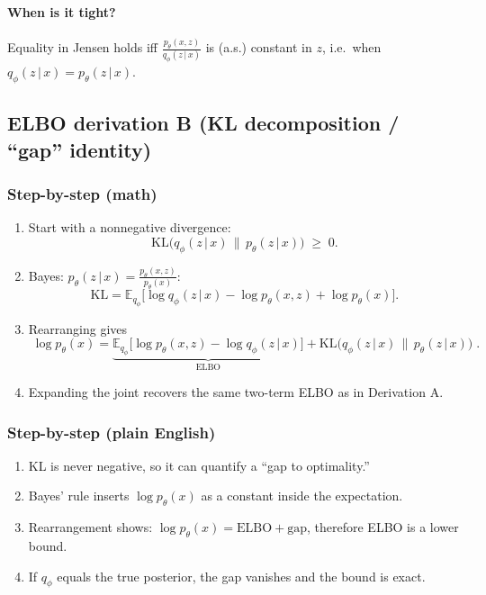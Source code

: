\documentclass[11pt]{article}
\newcommand{\E}{\mathbb{E}}
\newcommand{\KL}{\mathrm{KL}}
\newcommand{\given}{\,\vert\,}
\theoremstyle{remark}
\begin{document}
\paragraph{When is it tight?}
Equality in Jensen holds iff $\frac{p_\theta(x,z)}{q_\phi(z\given x)}$ is (a.s.) constant in $z$, i.e.\ when $q_\phi(z\given x)=p_\theta(z\given x)$.

\subsection{ELBO derivation B (KL decomposition / ``gap'' identity)}
\subsubsection*{Step-by-step (math)}
\begin{enumerate}[leftmargin=1.6em]
  \item Start with a nonnegative divergence:
  \[
  \KL\!\big(q_\phi(z\given x)\,\|\,p_\theta(z\given x)\big)\;\ge\;0.
  \]
  \item Bayes: $p_\theta(z\given x)=\frac{p_\theta(x,z)}{p_\theta(x)}$:
  \[
  \KL
  = \E_{q_\phi}\!\big[\log q_\phi(z\given x)-\log p_\theta(x,z)+\log p_\theta(x)\big].
  \]
  \item Rearranging gives
  \[
  \boxed{\;
  \log p_\theta(x)
  = \underbrace{\E_{q_\phi}\!\big[\log p_\theta(x,z)-\log q_\phi(z\given x)\big]}_{\text{ELBO}}
  + \KL\!\big(q_\phi(z\given x)\,\|\,p_\theta(z\given x)\big)\; }.
  \]
  \item Expanding the joint recovers the same two-term ELBO as in Derivation A.
\end{enumerate}

\subsubsection*{Step-by-step (plain English)}
\begin{enumerate}[leftmargin=1.6em]
  \item KL is never negative, so it can quantify a ``gap to optimality.''
  \item Bayes' rule inserts $\log p_\theta(x)$ as a constant inside the expectation.
  \item Rearrangement shows: $\log p_\theta(x) = \text{ELBO} + \text{gap}$, therefore ELBO is a lower bound.
  \item If $q_\phi$ equals the true posterior, the gap vanishes and the bound is exact.
\end{enumerate}
\end{document}
